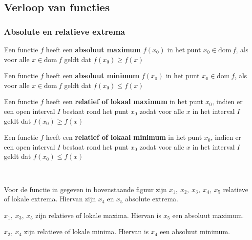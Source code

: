 \subsection{Verloop van functies}

\subsubsection{Absolute en relatieve extrema}


\begin{definitie}
	Een functie $f$ heeft een \textbf{absoluut maximum} $f(x_{0})$
in het punt $x_{0}\in\textrm{dom}\:f$, als voor alle $x\in\textrm{dom}\:f$
geldt dat $f(x_{0})\geqslant f(x)$

Een functie $f$ heeft een \textbf{absoluut minimum} $f(x_{0})$
in het punt $x_{0}\in\textrm{dom}\:f$, als voor alle $x\in\textrm{dom}\:f$
geldt dat $f(x_{0})\leqslant f(x)$

Een functie $f$ heeft een \textbf{relatief of lokaal maximum}
in het punt $x_{0}$, indien er een open interval $I$ bestaat rond
het punt $x_{0}$ zodat voor alle $x$ in het interval $I$ geldt
dat $f(x_{0})\geqslant f(x)$

Een functie $f$ heeft een \textbf{relatief of lokaal minimum}
in het punt $x_{0}$, indien er een open interval $I$ bestaat rond
het punt $x_{0}$ zodat voor alle $x$ in het interval $I$ geldt
dat $f(x_{0})\leqslant f(x)$

\end{definitie}


\begin{voorbeeld}
\ 	


Voor de functie in gegeven in bovenstaande figuur zijn $x_{1},\:x_{2},\:x_{3},\:x_{4},\:x_{5}$ relatieve
of lokale extrema. Hiervan zijn $x_{4}$ en $x_{5}$ absolute extrema.

$x_{1},\:x_{3},\:x_{5}$ zijn relatieve of lokale maxima.
Hiervan is $x_{5}$ een absoluut maximum.

$x_{2},\:x_{4}$ zijn relatieve of lokale minima. Hiervan
is $x_{4}$ een absoluut minimum.

\end{voorbeeld}

